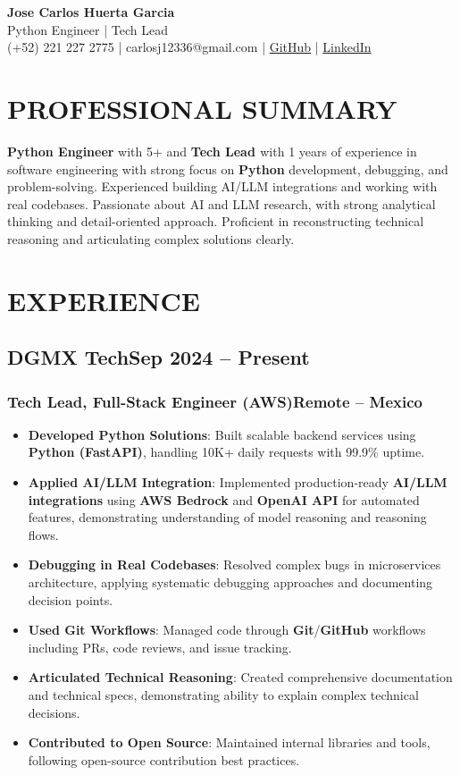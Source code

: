 \documentclass[a4paper,10pt]{article}
\newcommand{\kw}[1]{\textbf{\textcolor{keyword}{#1}}}
\newcommand{\tech}[1]{\textbf{\textcolor{tech}{#1}}}
\begin{document}
\begin{center}
{\bfseries\LARGE Jose Carlos Huerta Garcia} \\
Python Engineer | Tech Lead \\
(+52) 221 227 2775 | carlosj12336@gmail.com | \href{https://github.com/jcarloshg}{GitHub} | \href{https://www.linkedin.com/in/jose-carlos-huerta-garcia-773952212}{LinkedIn}
\end{center}

\section*{PROFESSIONAL SUMMARY}
\kw{Python Engineer} with 5+ and \kw{Tech Lead } with 1 years of experience in software engineering with strong focus on \kw{Python} development, debugging, and problem-solving. Experienced building AI/LLM integrations and working with real codebases. Passionate about AI and LLM research, with strong analytical thinking and detail-oriented approach. Proficient in reconstructing technical reasoning and articulating complex solutions clearly.

\section*{EXPERIENCE}

\subsection*{DGMX Tech\hfill\textbf{Sep 2024 -- Present}}
\subsubsection*{Tech Lead, Full-Stack Engineer (AWS)\hfill Remote -- Mexico}
\begin{itemize}[noitemsep, leftmargin=*]
    \item \textbf{Developed Python Solutions}: Built scalable backend services using \tech{Python (FastAPI)}, handling 10K+ daily requests with 99.9\% uptime.
    \item \textbf{Applied AI/LLM Integration}: Implemented production-ready \kw{AI/LLM integrations} using \tech{AWS Bedrock} and \tech{OpenAI API} for automated features, demonstrating understanding of model reasoning and reasoning flows.
    \item \textbf{Debugging in Real Codebases}: Resolved complex bugs in microservices architecture, applying systematic debugging approaches and documenting decision points.
    \item \textbf{Used Git Workflows}: Managed code through \tech{Git}/\tech{GitHub} workflows including PRs, code reviews, and issue tracking.
    \item \textbf{Articulated Technical Reasoning}: Created comprehensive documentation and technical specs, demonstrating ability to explain complex technical decisions.
    \item \textbf{Contributed to Open Source}: Maintained internal libraries and tools, following open-source contribution best practices.
\end{itemize}
\end{document}
